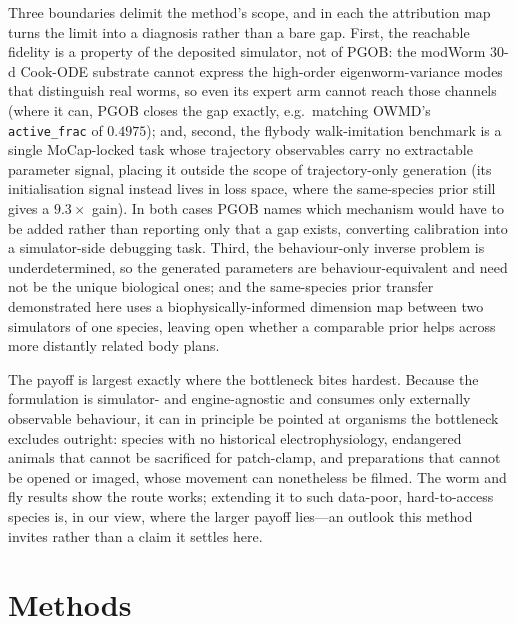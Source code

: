 \documentclass[11pt]{article}
\begin{document}
Three boundaries delimit the method's scope, and in each the attribution map turns the limit into a diagnosis rather than a bare gap. First, the reachable fidelity is a property of the deposited simulator, not of PGOB: the modWorm $30$-d Cook-ODE substrate cannot express the high-order eigenworm-variance modes that distinguish real worms, so even its expert arm cannot reach those channels (where it can, PGOB closes the gap exactly, e.g.\ matching OWMD's \texttt{active\_frac} of $0.4975$); and, second, the flybody walk-imitation benchmark is a single MoCap-locked task whose trajectory observables carry no extractable parameter signal, placing it outside the scope of trajectory-only generation (its initialisation signal instead lives in loss space, where the same-species prior still gives a $9.3\times$ gain). In both cases PGOB names which mechanism would have to be added rather than reporting only that a gap exists, converting calibration into a simulator-side debugging task. Third, the behaviour-only inverse problem is underdetermined, so the generated parameters are behaviour-equivalent and need not be the unique biological ones; and the same-species prior transfer demonstrated here uses a biophysically-informed dimension map between two simulators of one species, leaving open whether a comparable prior helps across more distantly related body plans.

The payoff is largest exactly where the bottleneck bites hardest. Because the formulation is simulator- and engine-agnostic and consumes only externally observable behaviour, it can in principle be pointed at organisms the bottleneck excludes outright: species with no historical electrophysiology, endangered animals that cannot be sacrificed for patch-clamp, and preparations that cannot be opened or imaged, whose movement can nonetheless be filmed. The worm and fly results show the route works; extending it to such data-poor, hard-to-access species is, in our view, where the larger payoff lies---an outlook this method invites rather than a claim it settles here.

\section*{Methods}
\end{document}
